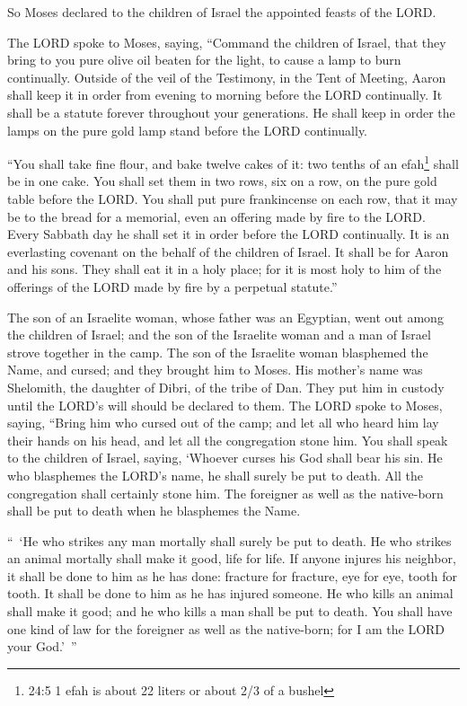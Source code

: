 \myverse{}So Moses declared to the children of Israel the appointed feasts
of the LORD.


\mychapter{} \myverse*{}The LORD spoke to Moses, saying,
\myverse{}“Command the children of Israel, that they bring to you pure olive oil beaten
for the light, to cause a lamp to burn continually.
\myverse{}Outside of the veil of the Testimony, in the Tent of Meeting, Aaron shall keep
it in order from evening to morning before the LORD continually. It shall be a statute forever throughout
your generations.
\myverse{}He shall keep in order the lamps on the pure gold lamp stand before the LORD
continually.


\myverse{}“You shall take fine flour, and bake twelve cakes of it: two tenths
of an efah\footnote{24:5 1 efah is about 22 liters or about 2/3 of a bushel} shall be in one cake.
\myverse{}You shall set them in two rows, six on a row, on the pure gold table before
the LORD.
\myverse{}You shall put pure frankincense on each row, that it may be to the bread for
a memorial, even an offering made by fire to the LORD.
\myverse{}Every Sabbath day he shall set it in order before the LORD continually. It
is an everlasting covenant on the behalf of the children of Israel.
\myverse{}It shall be for Aaron and his sons. They shall eat it in a holy place; for
it is most holy to him of the offerings of the LORD made by fire by a perpetual statute.”


\myverse{}The son of an Israelite woman, whose father was an Egyptian,
went out among the children of Israel; and the son of the Israelite woman and a man of Israel strove together
in the camp.
\myverse{}The son of the Israelite woman blasphemed the Name, and cursed; and they
brought him to Moses. His mother’s name was Shelomith, the daughter of Dibri, of the tribe of Dan.
\myverse{}They put him in custody until the LORD’s will should be declared to them.
\myverse{}The LORD spoke to Moses, saying,
\myverse{}“Bring him who cursed out of the camp; and let all who heard him lay their
hands on his head, and let all the congregation stone him.
\myverse{}You shall speak to the children of Israel, saying, ‘Whoever curses his God
shall bear his sin.
\myverse{}He who blasphemes the LORD’s name, he shall surely be put to death. All the
congregation shall certainly stone him. The foreigner as well as the native-born shall be put to death
when he blasphemes the Name.


\myverse{}“ ‘He who strikes any man mortally shall surely be put to death.
\myverse{}He who strikes an animal mortally shall make it good, life for life.
\myverse{}If anyone injures his neighbor, it shall be done to him as he has done:
\myverse{}fracture for fracture, eye for eye, tooth for tooth. It shall be done to
him as he has injured someone.
\myverse{}He who kills an animal shall make it good; and he who kills a man shall be
put to death.
\myverse{}You shall have one kind of law for the foreigner as well as the native-born;
for I am the LORD your God.’ ”



